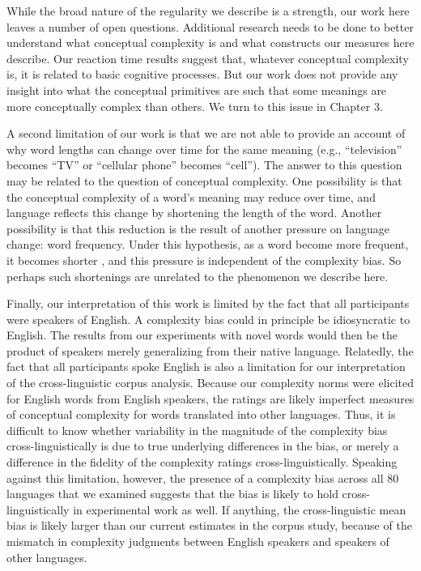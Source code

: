 While the broad nature of the regularity we describe is a strength, our work here leaves a number of open questions. Additional research needs to be done to better understand what conceptual complexity is and what constructs our measures here describe. Our reaction time results suggest that, whatever conceptual complexity is, it is related to basic cognitive processes. But our work does not provide any insight into what the conceptual primitives are such that some meanings are more conceptually complex than others. We turn to this issue in Chapter 3.

A second limitation of our work is that we are not able to provide an account of why word lengths can change over time for the same meaning (e.g., ``television'' becomes ``TV'' or ``cellular phone'' becomes ``cell''). The answer to this question may be related to the question of conceptual complexity. One possibility is that the conceptual complexity of a word's meaning may reduce over time, and language reflects this change by shortening the length of the word. Another possibility is that this reduction is the result of another pressure on language change: word frequency. Under this hypothesis, as a word become more frequent, it becomes shorter \cite{zipf1936}, and this pressure is independent of the complexity bias. So perhaps such shortenings are unrelated to the phenomenon we describe here.

Finally, our interpretation of this work is limited by the fact that all participants were speakers of English. A complexity bias could in principle be idiosyncratic to English. The results from our experiments with novel words would then be the product of speakers merely generalizing from their native language. Relatedly, the fact that all participants spoke English is also a limitation for our interpretation of the cross-linguistic corpus analysis. Because our complexity norms were elicited for English words from English speakers, the ratings are likely imperfect measures of conceptual complexity for words translated into other languages. Thus, it is difficult to know whether variability in the magnitude of the complexity bias cross-linguistically is due to true underlying differences in the bias, or merely a difference in the fidelity of the complexity ratings cross-linguistically. Speaking against this limitation, however, the presence of a complexity bias across all 80 languages that we examined suggests that the bias is likely to hold cross-linguistically in experimental work as well. If anything, the cross-linguistic mean bias is likely larger than our current estimates in the corpus study, because of the mismatch in complexity judgments between English speakers and speakers of other languages.

